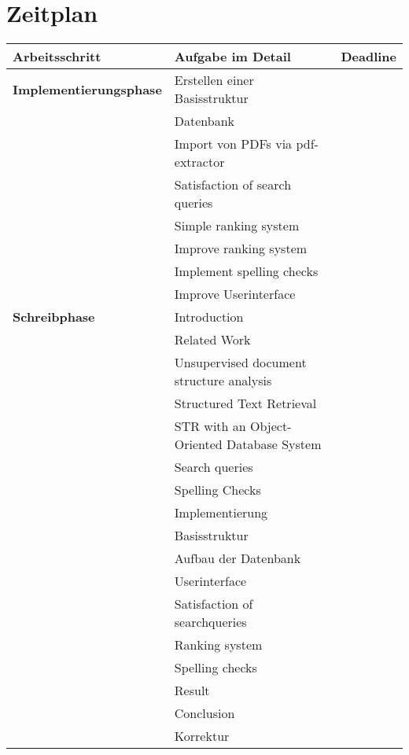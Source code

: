 \documentclass[a4paper, 12pt]{scrartcl}
\begin{document}

\nocite{*}

\section{Zeitplan}


\begin{tabular}{ | l | l | c | }
  \hline
  \rowcolor{lightblue}
  \textbf{Arbeitsschritt} & \textbf{Aufgabe im Detail} & \textbf{Deadline} \\ \hline
  \textbf{Implementierungsphase} & Erstellen einer Basisstruktur & \\ \hline
    & Datenbank & \\ \hline
    & Import von PDFs via pdf-extractor & \\ \hline
    & Satisfaction of search queries & \\ \hline
    & Simple ranking system & \\ \hline
    & Improve ranking system & \\ \hline
    & Implement spelling checks & \\ \hline
    & Improve Userinterface & \\ \hline
  \textbf{Schreibphase} & Introduction & \\ \hline
    & Related Work & \\ \hline
    & Unsupervised document structure analysis & \\ \hline
    & Structured Text Retrieval & \\ \hline
    & STR with an Object-Oriented Database System & \\ \hline
    & Search queries & \\ \hline
    & Spelling Checks & \\ \hline
    & Implementierung & \\ \hline
    & Basisstruktur & \\ \hline
    & Aufbau der Datenbank & \\ \hline
    & Userinterface & \\ \hline
    & Satisfaction of searchqueries & \\ \hline
    & Ranking system & \\ \hline
    & Spelling checks & \\ \hline
    & Result & \\ \hline
    & Conclusion & \\ \hline
    & Korrektur & \\ \hline
\end{tabular}
\end{document}
